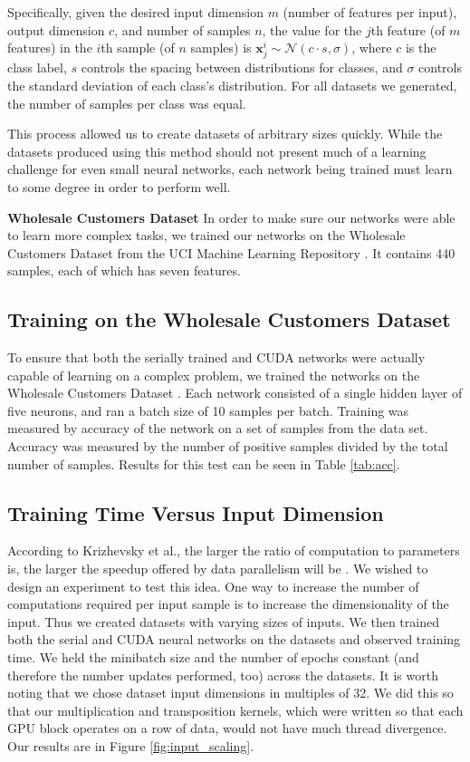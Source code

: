\documentclass[11pt,a4paper]{article}
\begin{document}
Specifically, given the desired input dimension $m$ (number of features per input), output dimension $c$, and number of samples $n$, the value for the $j$th feature (of $m$ features) in the $i$th sample (of $n$ samples) is $\bm{x}_j^i \sim \mathcal{N}(c\cdot s, \sigma)$, where $c$ is the class label, $s$ controls the spacing between distributions for classes, and $\sigma$ controls the standard deviation of each class's distribution. For all datasets we generated, the number of samples per class was equal.

This process allowed us to create datasets of arbitrary sizes quickly. While the datasets produced using this method should not present much of a learning challenge for even small neural networks, each network being trained must learn to some degree in order to perform well.

\vspace{10pt}
\noindent \textbf{Wholesale Customers Dataset} In order to make sure our networks were able to learn more complex tasks, we trained our networks on the Wholesale Customers Dataset from the UCI Machine Learning Repository \cite{wholesale_cust}. It contains 440 samples, each of which has seven features.

\subsection{Training on the Wholesale Customers Dataset}
To ensure that both the serially trained and CUDA networks were actually capable of learning on a complex problem, we trained the networks on the Wholesale Customers Dataset \cite{wholesale_cust}. Each network consisted of a single hidden layer of five neurons, and ran a batch size of 10 samples per batch. Training was measured by accuracy of the network on a set of samples from the data set. Accuracy was measured by the number of positive samples divided by the total number of samples. Results for this test can be seen in Table \ref{tab:acc}.


\subsection{Training Time Versus Input Dimension}
According to Krizhevsky et al., the larger the ratio of computation to parameters is, the larger the speedup offered by data parallelism will be \cite{one_weird_trick_cnns}. We wished to design an experiment to test this idea. One way to increase the number of computations required per input sample is to increase the dimensionality of the input. Thus we created datasets with varying sizes of inputs. We then trained both the serial and CUDA neural networks on the datasets and observed training time. We held the minibatch size and the number of epochs constant (and therefore the number updates performed, too) across the datasets. It is worth noting that we chose dataset input dimensions in multiples of 32. We did this so that our multiplication and transposition kernels, which were written so that each GPU block operates on a row of data, would not have much thread divergence. Our results are in Figure \ref{fig:input_scaling}.  
\end{document}
